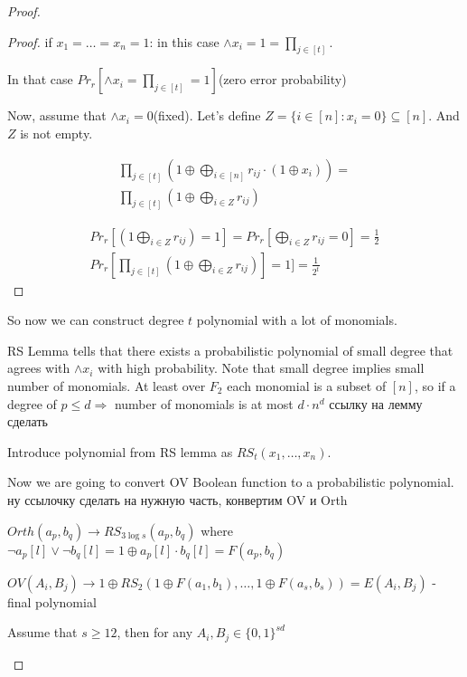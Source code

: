\begin{proof}
\begin{lm}
		\begin{proof}
			if $x_1 = \dots = x_n = 1$: in this case $\land x_i = 1 = \prod_{j \in [t]}$.

			In that case $Pr_r[\land x_i = \prod_{j \in [t]} = 1]$(zero error probability)

			Now, assume that $\land x_i = 0$(fixed).
			Let's define $Z = \{ i \in [n]: x_i = 0 \} \subseteq [n]$.
			And $Z$ is not empty.

			\begin{align*}
				\prod_{j \in [t]}(1 \oplus \bigoplus_{i \in [n]} r_{i j} \cdot (1 \oplus x_i)) = \\
				\prod_{j \in [t]}(1 \oplus \bigoplus_{i \in Z} r_{i j})
			\end{align*}

			\begin{align*}
				Pr_r[(1 \bigoplus_{i \in Z} r_{i j}) = 1] = Pr_r[\bigoplus_{i \in Z} r_{i j} = 0] = \frac{1}{2}\\
				Pr_r[\prod_{j \in [t]}(1 \oplus \bigoplus_{i \in Z}r_{i j})] = 1]=\frac{1}{2^{t}}
			\end{align*}
		\end{proof}

		So now we can construct degree $t$ polynomial with a lot of monomials.

		RS Lemma tells that there exists a probabilistic polynomial of small degree that agrees with $\land x_i$ with high probability. Note that small degree implies small number of monomials.
		At least over $F_2$ each monomial is a subset of $[n]$, so if a degree of $p \leq d \Rightarrow$ number of monomials is at most $d \cdot n^{d}$     {\color{red} ссылку на лемму сделать}

		Introduce polynomial from RS lemma as $RS_t(x_1, \dots, x_n)$.

		Now we are going to convert OV Boolean function to a probabilistic polynomial.
		{\color{red} ну ссылочку сделать на нужную часть, конвертим OV и Orth}

		$Orth(a_p, b_q) \to RS_{3 \log s}(a_p, b_q)$ where $\neg a_p[l] \lor \neg b_q[l] = 1 \oplus a_p[l] \cdot b_q[l] = F(a_p, b_q)$

		$OV(A_i, B_j) \to 1 \oplus RS_2(1 \oplus F(a_1, b_1), \dots, 1 \oplus F(a_s, b_s)) = E(A_i, B_j)$ - final polynomial

		\begin{lm}

			Assume that $s \geq 12$, then for any $A_i, B_j \in \{0, 1\}^{sd}$


\end{lm}
\end{lm}
\end{proof}
